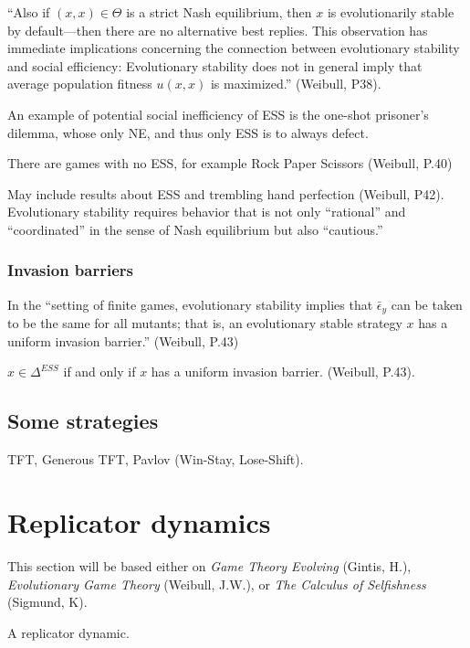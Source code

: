 ``Also if $(x, x) \in \Theta$ is a strict Nash equilibrium, then $x$ is evolutionarily stable by default---then there are no alternative best replies. This observation has immediate implications concerning the connection between evolutionary stability and social efficiency: Evolutionary stability does not in general imply that average population fitness $u(x, x)$ is maximized.'' (Weibull, P38).

An example of potential social inefficiency of ESS is the one-shot prisoner's dilemma, whose only NE, and thus only ESS is to always defect.

There are games with no ESS, for example Rock Paper Scissors (Weibull, P.40)

May include results about ESS and trembling hand perfection (Weibull, P42). Evolutionary stability requires behavior that is not only ``rational'' and ``coordinated'' in the sense of Nash equilibrium but also ``cautious.''

\subsubsection{Invasion barriers}
In the ``setting of finite games, evolutionary stability implies that $\bar{\epsilon}_y$ can be taken to be the same for all mutants; that is, an evolutionary stable strategy $x$ has a uniform invasion barrier.'' (Weibull, P.43)
\begin{proposition}
$x \in \Delta^{ESS}$ if and only if $x$ has a uniform invasion barrier. (Weibull, P.43).
\end{proposition}


\subsection{Some strategies}
TFT, Generous TFT, Pavlov (Win-Stay, Lose-Shift).

\section{Replicator dynamics}
This section will be based either on \emph{Game Theory Evolving} (Gintis, H.), \emph{Evolutionary Game Theory} (Weibull, J.W.), or \emph{The Calculus of Selfishness} (Sigmund, K).

\begin{definition}
A replicator dynamic.
\end{definition}

